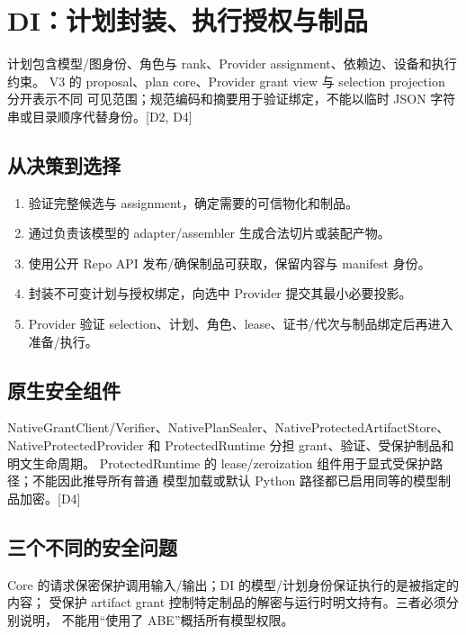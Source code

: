\newpage

\section{DI：计划封装、执行授权与制品}
计划包含模型/图身份、角色与 rank、Provider assignment、依赖边、设备和执行约束。
V3 的 proposal、plan core、Provider grant view 与 selection projection 分开表示不同
可见范围；规范编码和摘要用于验证绑定，不能以临时 JSON 字符串或目录顺序代替身份。[D2, D4]

\subsection{从决策到选择}
\begin{enumerate}
\item 验证完整候选与 assignment，确定需要的可信物化和制品。
\item 通过负责该模型的 adapter/assembler 生成合法切片或装配产物。
\item 使用公开 Repo API 发布/确保制品可获取，保留内容与 manifest 身份。
\item 封装不可变计划与授权绑定，向选中 Provider 提交其最小必要投影。
\item Provider 验证 selection、计划、角色、lease、证书/代次与制品绑定后再进入准备/执行。
\end{enumerate}

\subsection{原生安全组件}
NativeGrantClient/Verifier、NativePlanSealer、NativeProtectedArtifactStore、
NativeProtectedProvider 和 ProtectedRuntime 分担 grant、验证、受保护制品和明文生命周期。
ProtectedRuntime 的 lease/zeroization 组件用于显式受保护路径；不能因此推导所有普通
模型加载或默认 Python 路径都已启用同等的模型制品加密。[D4]

\subsection{三个不同的安全问题}
Core 的请求保密保护调用输入/输出；DI 的模型/计划身份保证执行的是被指定的内容；
受保护 artifact grant 控制特定制品的解密与运行时明文持有。三者必须分别说明，
不能用“使用了 ABE”概括所有模型权限。



